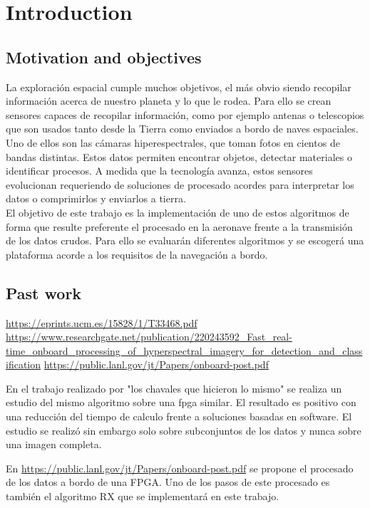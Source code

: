 \cleardoublepage
\chapter{Introduction}
\label{makereference}

\section{Motivation and objectives}

La exploración espacial cumple muchos objetivos, el más obvio siendo recopilar información acerca de nuestro planeta y lo que le rodea. Para ello se crean sensores capaces de recopilar información, como por ejemplo antenas o telescopios que son usados tanto desde la Tierra como enviados a bordo de naves espaciales. Uno de ellos son las cámaras hiperespectrales, que toman fotos en cientos de bandas distintas. Estos datos permiten encontrar objetos, detectar materiales o identificar procesos. A medida que la tecnología avanza, estos sensores evolucionan requeriendo de soluciones de procesado acordes para interpretar los datos o comprimirlos y enviarlos a tierra.
\\
El objetivo de este trabajo es la implementación de uno de estos algoritmos de forma que resulte preferente el procesado en la aeronave frente a la transmisión de los datos crudos. Para ello se evaluarán diferentes algoritmos y se escogerá una plataforma acorde a los requisitos de la navegación a bordo.

\section{Past work}
\url{https://eprints.ucm.es/15828/1/T33468.pdf}
\url{https://www.researchgate.net/publication/220243592_Fast_real-time_onboard_processing_of_hyperspectral_imagery_for_detection_and_classification}
\url{https://public.lanl.gov/jt/Papers/onboard-post.pdf}

En el trabajo realizado por "los chavales que hicieron lo mismo" se realiza un estudio del mismo algoritmo sobre una fpga similar. El resultado es positivo con una reducción del tiempo de calculo frente a soluciones basadas en software. El estudio se realizó sin embargo solo sobre subconjuntos de los datos y nunca sobre una imagen completa.

En \url{https://public.lanl.gov/jt/Papers/onboard-post.pdf} se propone el procesado de los datos a bordo de una FPGA. Uno de los pasos de este procesado es también el algoritmo RX que se implementará en este trabajo.

